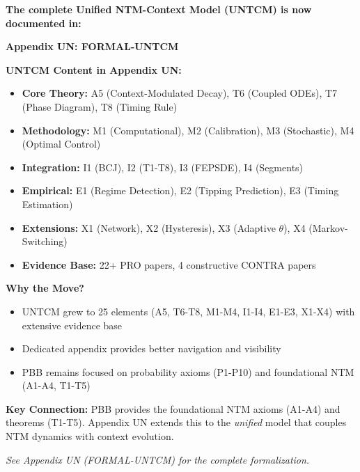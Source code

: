 \documentclass[11pt, a4paper]{article}
\begin{document}
\begin{tcolorbox}[colback=orange!5!white, colframe=orange!75!black,
    title=\textbf{Cross-Reference: UNTCM moved to Appendix UN}]

\textbf{The complete Unified NTM-Context Model (UNTCM) is now documented in:}

\begin{center}
\Large\textbf{Appendix UN: FORMAL-UNTCM}
\end{center}

\textbf{UNTCM Content in Appendix UN:}
\begin{itemize}[nosep]
    \item \textbf{Core Theory:} A5 (Context-Modulated Decay), T6 (Coupled ODEs), T7 (Phase Diagram), T8 (Timing Rule)
    \item \textbf{Methodology:} M1 (Computational), M2 (Calibration), M3 (Stochastic), M4 (Optimal Control)
    \item \textbf{Integration:} I1 (BCJ), I2 (T1-T8), I3 (FEPSDE), I4 (Segments)
    \item \textbf{Empirical:} E1 (Regime Detection), E2 (Tipping Prediction), E3 (Timing Estimation)
    \item \textbf{Extensions:} X1 (Network), X2 (Hysteresis), X3 (Adaptive $\theta$), X4 (Markov-Switching)
    \item \textbf{Evidence Base:} 22+ PRO papers, 4 constructive CONTRA papers
\end{itemize}

\textbf{Why the Move?}
\begin{itemize}[nosep]
    \item UNTCM grew to 25 elements (A5, T6-T8, M1-M4, I1-I4, E1-E3, X1-X4) with extensive evidence base
    \item Dedicated appendix provides better navigation and visibility
    \item PBB remains focused on probability axioms (P1-P10) and foundational NTM (A1-A4, T1-T5)
\end{itemize}

\textbf{Key Connection:} PBB provides the foundational NTM axioms (A1-A4) and theorems (T1-T5). Appendix UN extends this to the \emph{unified} model that couples NTM dynamics with context evolution.

\vspace{0.5em}
\textit{See Appendix UN (FORMAL-UNTCM) for the complete formalization.}

\end{tcolorbox}
\end{document}
